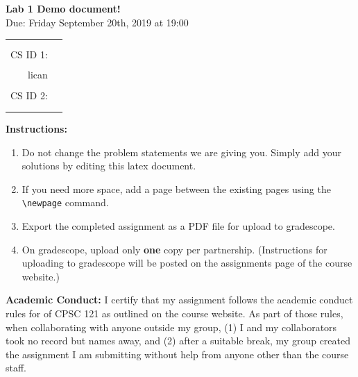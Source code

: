 \documentclass[a4paper, 20pt]{article}
\begin{document}

\begin{center}
    \LARGE
    \textbf{Lab 1 Demo document!}
    \\[1ex]
    \Large Due: Friday September 20th, 2019 at 19:00\\
\end{center}
    \LARGE
\begin{tabular}{rl}
 & \\
CS ID 1: & \rule{3cm}{0.25mm}\\
 lican \\
 
CS ID 2: & \rule{3cm}{0.25mm}\\
 & \\
\end{tabular}
\large

\textbf{Instructions:}
\begin{enumerate}
\item Do not change the problem statements we are giving you. Simply add your solutions by editing this latex document. 
\item If you need more space, add a page between the existing pages using the \texttt{\textbackslash newpage} command.
\item Export the completed assignment as a PDF file for upload to gradescope.
\item On gradescope, upload only \textbf{one} copy per partnership. (Instructions for uploading to gradescope will be posted on the assignments page of the course website.)
\end{enumerate}

\textbf{Academic Conduct:} 
I certify that my assignment follows the academic conduct rules for of CPSC 121 as outlined on the course website. As part of those rules, when collaborating with anyone outside my group, (1) I and my collaborators took no record but names away, and (2) after a suitable break, my group created the assignment I am submitting without help from anyone other than the course staff. \\


\newpage
\begin{enumerate}

\newpage

\newpage

\newpage

\end{enumerate}
\end{document}
